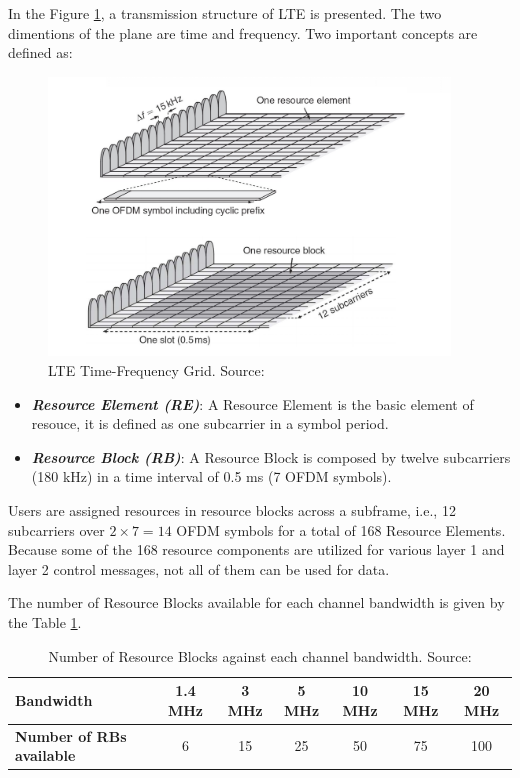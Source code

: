 In the Figure \ref{fig:lterb}, a transmission structure of LTE is presented. The two dimentions of the 
plane are time and frequency. Two important concepts are defined as:

\begin{figure}[h]
  \centering
  \includegraphics[width=0.95\textwidth]{img/lte_rb.png}
  \caption{LTE Time-Frequency Grid. Source:\cite{cmov1} }
  \label{fig:lterb}
\end{figure}

\begin{itemize}
  \item \textbf{\textit{Resource Element (RE)}}: A Resource Element is the basic element of resouce, it is
  defined as one subcarrier in a symbol period.
  \item \textbf{\textit{Resource Block (RB)}}: A Resource Block is composed by twelve subcarriers (180 kHz) in 
  a time interval of 0.5 ms (7 OFDM symbols).
\end{itemize}


Users are assigned resources in resource blocks across a subframe, i.e., 12 subcarriers over ${2\times7 = 14}$
OFDM symbols for a total of 168 Resource Elements. Because some of the 168 resource components are utilized 
for various layer 1 and layer 2 control messages, not all of them can be used for data.

The number of Resource Blocks available for each channel bandwidth is given by the Table \ref{table:rb}. 

\begin{table}[h]
  \centering
  \begin{tabular}{@{}lcccccc@{}}
  \toprule
  \textbf{Bandwidth}               & 1.4 MHz & 3 MHz & 5 MHz & 10 MHz & 15 MHz & 20 MHz \\ \midrule
  \textbf{Number of RBs available} & 6       & 15    & 25    & 50     & 75     & 100    \\ \bottomrule
  \end{tabular}
  \caption{Number of Resource Blocks against each channel bandwidth. Source: \cite{ofdma1}}
  \label{table:rb}
\end{table}

